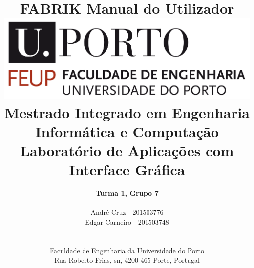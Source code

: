 \documentclass[a4paper]{article}
\begin{document}
\setlength{\textwidth}{16cm}
\setlength{\textheight}{22cm}

\title{\Huge\textbf{FABRIK}\linebreak\linebreak\linebreak
\Large\textbf{Manual do Utilizador}\linebreak\linebreak
\linebreak\linebreak
\includegraphics[scale=0.1]{images/feup-logo.png}\linebreak\linebreak
\linebreak\linebreak
\Large{Mestrado Integrado em Engenharia Informática e Computação} \linebreak\linebreak
\Large{Laboratório de Aplicações com Interface Gráfica}\linebreak
}

\author{\textbf{Turma 1, Grupo 7}\\
\linebreak\\
André Cruz - 201503776 \\
Edgar Carneiro - 201503748 \\
\linebreak\linebreak \\
 \\ Faculdade de Engenharia da Universidade do Porto \\ Rua Roberto Frias, s\/n, 4200-465 Porto, Portugal \linebreak\linebreak\linebreak
\linebreak\linebreak\vspace{1cm}}

\maketitle
\thispagestyle{empty}
\end{document}
